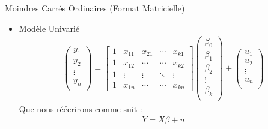 \documentclass{beamer}
\begin{document}
\begin{frame}{Moindres Carrés Ordinaires (Format Matricielle)}
\begin{itemize}
  \item Modèle Univarié 
  \begin{align*}
    \begin{pmatrix}
      y_1 \\ 
      y_2 \\ 
      \vdots \\
      y_n \\
    \end{pmatrix} = 
    \begin{bmatrix}
      1 & x_{11} & x_{21} & \cdots & x_{k1} \\ 
      1 & x_{12} & \cdots & \cdots & x_{k2} \\ 
      1 & \vdots & \vdots & \ddots & \vdots \\ 
      1 & x_{1n} & \cdots & \cdots & x_{kn}
    \end{bmatrix}
    \begin{pmatrix}
      \beta_0 \\ 
      \beta_1 \\ 
      \beta_2 \\ 
      \vdots \\
      \beta_k \\
    \end{pmatrix} + 
    \begin{pmatrix}
      u_1 \\ 
      u_2 \\ 
      \vdots \\
      u_n \\
    \end{pmatrix}
  \end{align*}
  Que nous réécrirons comme suit : 
  \begin{align*}
    Y = X \beta + u 
  \end{align*}
\end{itemize}
\end{frame}
\end{document}
